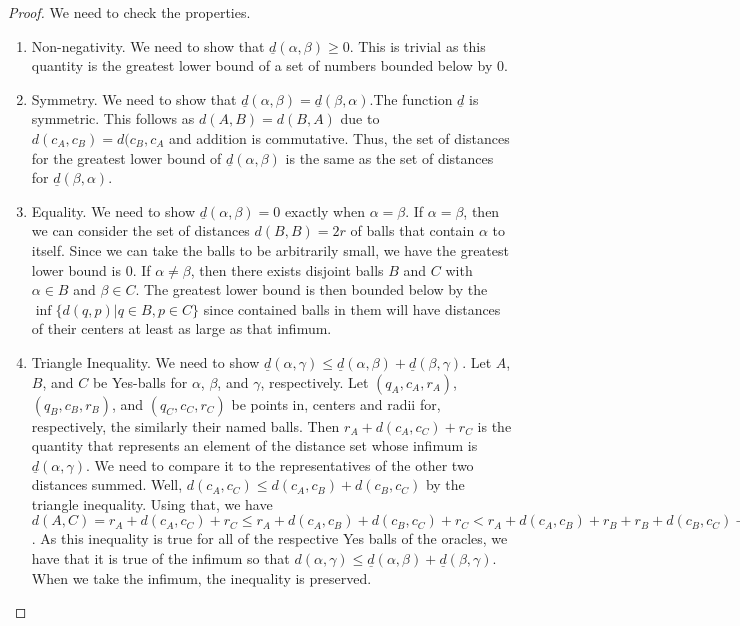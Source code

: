 \documentclass[12pt]{article}
\begin{document}
\begin{proof}
We need to check the properties. 
\begin{enumerate}
\item Non-negativity. We need to show that $\underline{d}(\alpha, \beta) \geq 0$. This is trivial as this quantity is the greatest lower bound of a set of numbers bounded below by 0. 
\item Symmetry. We need to show that $\underline{d}(\alpha,\beta) = \underline{d}(\beta,\alpha)$.The function $\underline{d}$ is symmetric. This follows as $d(A,B) = d(B,A)$ due to $d(c_A, c_B) = d(c_B, c_A$ and addition is commutative. Thus, the set of distances for the greatest lower bound of $\underline{d}(\alpha,\beta)$ is the same as the set of distances for $\underline{d}(\beta,\alpha)$.
\item Equality. We need to show $\underline{d}(\alpha,\beta) = 0$ exactly when $\alpha=\beta$. If $\alpha=\beta$, then we can consider the set of distances $d(B,B)= 2r$ of balls that contain $\alpha$ to itself. Since we can take the balls to be arbitrarily small, we have the greatest lower bound is 0. If $\alpha \neq \beta$, then there exists disjoint balls $B$ and $C$ with $\alpha \in B$ and $\beta \in C$. The greatest lower bound is then bounded below by the $\inf\{d(q,p) | q \in B, p \in C\}$ since contained balls in them will have distances of their centers at least as large as that infimum. 
\item Triangle Inequality. We need to show $\underline{d}(\alpha,\gamma) \leq \underline{d}(\alpha,\beta) + \underline{d}(\beta,\gamma)$. Let $A$, $B$, and $C$ be Yes-balls for $\alpha$, $\beta$, and $\gamma$, respectively. Let $(q_A,c_A, r_A)$, $(q_B,c_B, r_B)$, and $(q_C,c_C, r_C)$ be points in, centers and radii for, respectively, the similarly their named balls. Then $r_A + d(c_A, c_C) + r_C$ is the quantity that represents an element of the distance set whose infimum is $\underline{d}(\alpha,\gamma)$. We need to compare it to the representatives of the other two distances summed. Well, $d(c_A,c_C) \leq d(c_A,c_B) + d(c_B, c_C)$ by the triangle inequality. Using that, we have  $d(A, C) = r_A + d(c_A, c_C) + r_C \leq r_A +  d(c_A,c_B) + d(c_B, c_C) + r_C <  r_A +  d(c_A,c_B) + r_B + r_B + d(c_B, c_C) + r_ C = d(A,B) + d(B, C)$. As this inequality is true for all of the respective Yes balls of the oracles, we have that it is true of the infimum so that $d(\alpha, \gamma) \leq \underline{d}(\alpha,\beta) + \underline{d}(\beta,\gamma)$. When we take the infimum, the inequality is preserved. 
\end{enumerate}
\end{proof}
\end{document}
